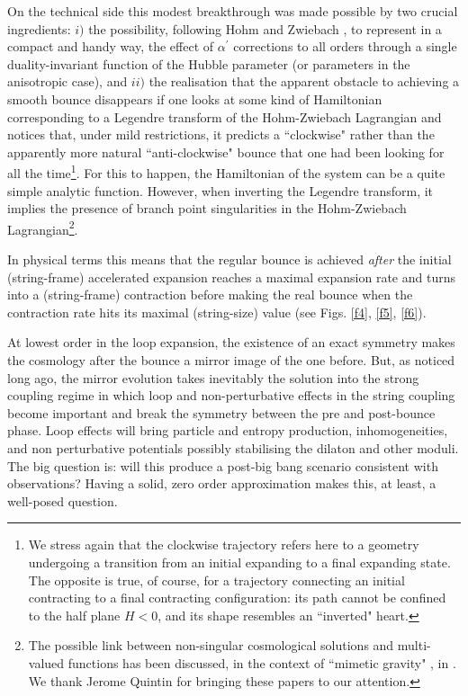 \documentclass[a4paper,11pt]{article}
\def \ap {\alpha^{\prime}}
\begin{document}
On the technical side this modest breakthrough was made possible by two crucial ingredients: $i)$ the possibility, following Hohm and Zwiebach \cite{1}, to represent in a compact and handy way, the effect of $\ap$ corrections to all orders through a single duality-invariant function of the Hubble parameter (or parameters in the anisotropic case), and $ii)$ the realisation that the apparent obstacle to achieving a smooth bounce disappears if one looks at some kind of Hamiltonian corresponding to a Legendre transform of the Hohm-Zwiebach Lagrangian and notices that, under mild restrictions, it predicts a ``clockwise"  rather than the apparently more natural ``anti-clockwise" bounce that one had been looking for all the time\footnote{We stress again that the clockwise trajectory refers here to a  geometry undergoing a transition from an initial expanding to a final expanding state. The opposite is true, of course, for a trajectory connecting an initial contracting to a final contracting configuration: its  path cannot be confined to the half plane $H < 0$, and its shape resembles an  ``inverted" heart.}. For this to happen, the Hamiltonian of the system can be a quite simple analytic function. However, when inverting the Legendre transform, it implies the presence of branch point singularities in the Hohm-Zwiebach Lagrangian\footnote{The possible link between non-singular cosmological solutions and multi-valued functions has been discussed, in the context of ``mimetic gravity" \cite{33},   in \cite{34,35}. We thank Jerome Quintin for bringing these papers to our attention.}.

In physical terms this means that the regular bounce is achieved {\it after} the initial (string-frame) accelerated expansion reaches a maximal expansion rate and turns into a (string-frame) contraction before making the real bounce when the contraction rate hits its maximal (string-size) value (see Figs. \ref{f4}, \ref{f5}, \ref{f6}).

At lowest order in the loop expansion, the existence of an exact symmetry \cite{Sen} makes the cosmology after the bounce a mirror image of the one before. But, as noticed long ago, the mirror evolution takes inevitably the solution into the strong coupling regime in which loop and non-perturbative effects in the string coupling become important and break the symmetry between the pre and post-bounce phase. Loop effects will bring particle and entropy production, inhomogeneities, and non perturbative potentials possibly stabilising the dilaton and other moduli. The big question is: will this produce a post-big bang scenario consistent with observations? Having a solid, zero order approximation makes this, at least,  a well-posed question.
\end{document}
